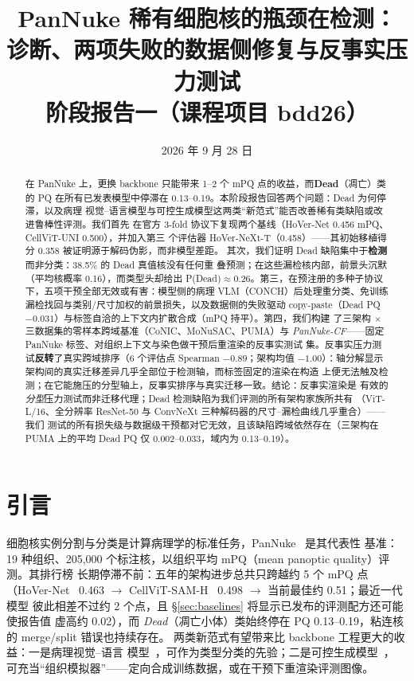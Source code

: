 \documentclass[11pt]{article}
\title{\bfseries PanNuke 稀有细胞核的瓶颈在检测：\\
诊断、两项失败的数据侧修复与反事实压力测试\\[6pt]
\large 阶段报告一（课程项目 bdd26）}
\author{}
\date{2026 年 9 月 28 日}
\begin{document}
\maketitle


\begin{abstract}
在 PanNuke 上，更换 backbone 只能带来 1--2 个 mPQ 点的收益，而\textbf{Dead}（凋亡）类
的 PQ 在所有已发表模型中停滞在 0.13--0.19。本阶段报告回答两个问题：Dead 为何停滞，以及病理
视觉--语言模型与可控生成模型这两类“新范式”能否改善稀有类缺陷或改进鲁棒性评测。我们首先
在官方 3-fold 协议下复现两个基线（HoVer-Net 0.456 mPQ、CellViT-UNI 0.500），并加入第三
个评估器 HoVer-NeXt-T（0.458）——其初始移植得分 0.358 被证明源于解码伪影，而非模型差距。
其次，我们证明 Dead 缺陷集中于\textbf{检测}而非分类：38.5\% 的 Dead 真值核没有任何重
叠预测；在这些漏检核内部，前景头沉默（平均核概率 0.16），而类型头却给出
P(Dead)$\approx$0.26。第三，在预注册的多种子协议下，五项干预全部无效或有害：模型侧的病理
VLM（CONCH）后处理重分类、免训练漏检找回与类别/尺寸加权的前景损失，以及数据侧的失败驱动
copy-paste（Dead PQ $-0.031$）与标签自洽的上下文内扩散合成（mPQ 持平）。第四，我们构建
了三架构 $\times$ 三数据集的零样本跨域基准（CoNIC、MoNuSAC、PUMA）与
\emph{PanNuke-CF}——固定 PanNuke 标签、对组织上下文与染色做干预后重渲染的反事实测试
集。反事实压力测试\textbf{反转}了真实跨域排序（6 个评估点 Spearman $-0.89$；架构均值
$-1.00$）：轴分解显示架构间的真实迁移差异几乎全部位于检测轴，而标签固定的渲染在构造
上便无法触及检测；在它能施压的分型轴上，反事实排序与真实迁移一致。结论：反事实渲染是
有效的\emph{分型}压力测试而非迁移代理；Dead 检测缺陷为我们评测的所有架构家族所共有
（ViT-L/16、全分辨率 ResNet-50 与 ConvNeXt 三种解码器的尺寸--漏检曲线几乎重合）——我们
测试的所有损失级与数据级干预都对它无效，且该缺陷跨域依然存在（三架构在 PUMA 上的平均
Dead PQ 仅 0.002--0.033，域内为 0.13--0.19）。
\end{abstract}

\section{引言}
\label{sec:intro}

细胞核实例分割与分类是计算病理学的标准任务，PanNuke~\cite{gamper2019pannuke} 是其代表性
基准：19 种组织、205,000 个标注核，以组织平均 mPQ（mean panoptic quality）评测。其排行榜
长期停滞不前：五年的架构进步总共只跨越约 5 个 mPQ 点
（HoVer-Net~\cite{graham2019hovernet} 0.463 $\rightarrow$
CellViT-SAM-H~\cite{horta2024cellvit} 0.498 $\rightarrow$ 当前最佳约 0.51；最近一代模型
彼此相差不过约 2 个点，且 \S\ref{sec:baselines} 将显示已发布的评测配方还可能使报告值
虚高约 0.02），而
\emph{Dead}（凋亡小体）类始终停在 PQ 0.13--0.19，粘连核的 merge/split 错误也持续存在。
两类新范式有望带来比 backbone 工程更大的收益：一是病理视觉--语言
模型~\cite{lu2024conch}，可作为类型分类的先验；二是可控生成模型~\cite{le2025pixcell}，
可充当“组织模拟器”——定向合成训练数据，或在干预下重渲染评测图像。
\end{document}
